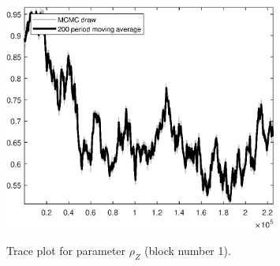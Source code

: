 \begin{figure}[H]
\centering
  \includegraphics[width=0.8\textwidth]{BRS_sectoral/graphs/TracePlot_rho_Z_blck_1}\\
    \caption{Trace plot for parameter ${\rho_Z}$ (block number 1).}
\end{figure}
